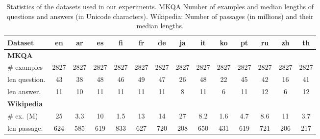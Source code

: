 \begin{table*}[ht]
\centering
\small
\renewcommand{\arraystretch}{1.2}
\setlength{\tabcolsep}{6pt}
\begin{tabular}{lccccccccccccc}
\toprule
\textbf{Dataset} & \textbf{en} & \textbf{ar} & \textbf{es} & \textbf{fi} & \textbf{fr} & \textbf{de} & \textbf{ja} & \textbf{it} & \textbf{ko} & \textbf{pt} & \textbf{ru} & \textbf{zh} & \textbf{th}\\
\midrule
\multicolumn{14}{l}{\textbf{MKQA}} \\
\# examples & 2827 & 2827 & 2827 & 2827 & 2827 & 2827 & 2827 & 2827 & 2827 & 2827 & 2827 & 2827 & 2827 \\
len question.   & 43   & 38   & 48   & 46   & 49   & 47   & 26   & 48   & 22   & 45   & 42   & 16   & 41\\
len answer.   & 11   & 10   & 11   & 11   & 11   & 11   &  8   & 11   &  6   & 11   & 12   &  6  & 12 \\
\midrule
\multicolumn{14}{l}{\textbf{Wikipedia}} \\
\# ex. (M)  & 25   & 3.3  & 10   & 1.5  & 13   & 14   & 27   & 8.2  & 1.6  & 4.7  & 8.6  & 11   & 3.7\\
len passage.   & 624  & 585  & 619  & 833  & 627  & 720  & 208  & 650  & 431  & 619  & 721  & 206  & 217\\
\bottomrule
\end{tabular}
\caption{Statistics of the datasets used in our experiments. MKQA Number of examples and median lengths of questions and answers (in Unicode characters). Wikipedia: Number of passages (in millions) and their median lengths.}
\label{tab:data_statistics}
\end{table*}
